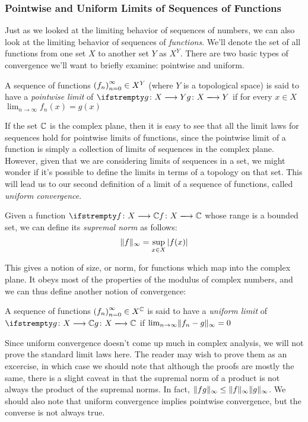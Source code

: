 \subsubsection{Pointwise and Uniform Limits of Sequences of Functions}
Just as we looked at the limiting behavior of sequences of numbers, we can also look at the limiting behavior of sequences of \emph{functions}. We'll denote the set of all functions from one set $X$ to another set $Y$ as $X^Y$. There are two basic types of convergence we'll want to briefly examine: pointwise and uniform.
\begin{definition}
A sequence of functions $\seq{f} \in X^Y$ (where $Y$ is a topological space) is said to have a \emph{pointwise limit} of $\fn{g}{X}{Y}$ if for every $x \in X$ $\lim_{n\to\infty} f_n (x) = g(x)$
\end{definition}
If the set $\mathbb{C}$ is the complex plane, then it is easy to see that all the limit laws for sequences hold for pointwise limits of functions, since the pointwise limit of a function is simply a collection of limits of sequences in the complex plane. However, given that we are considering limits of sequences in a set, we might wonder if it's possible to define the limits in terms of a topology on that set. This will lead us to our second definition of a limit of a sequence of functions, called \emph{uniform convergence}.
\begin{definition}
Given a function $\fn{f}{X}{\C}$ whose range is a bounded set, we can define its \emph{supremal norm} as follows:
\begin{align*}
\lVert f \rVert_\infty = \sup_{x \in X} \left\lvert f(x) \right\rvert
\end{align*}
\end{definition}
This gives a notion of size, or norm, for functions which map into the complex plane. It obeys most of the properties of the modulus of complex numbers, and we can thus define another notion of convergence:
\begin{definition}
A sequence of functions $\seq{f} \in X^\C$ is said to have a \emph{uniform limit} of $\fn{g}{X}{\C}$ if $\lim_{n\to\infty} \lVert f_n - g \rVert_\infty = 0$
\end{definition}
Since uniform convergence doesn't come up much in complex analysis, we will not prove the standard limit laws here. The reader may wish to prove them as an excercise, in which case we should note that although the proofs are mostly the same, there is a slight caveat in that the supremal norm of a product is not always the product of the supremal norms. In fact, $\lVert fg \rVert_\infty \leq \lVert f \rVert_\infty \lVert g \rVert_\infty$. We should also note that uniform convergence implies pointwise convergence, but the converse is not always true.
